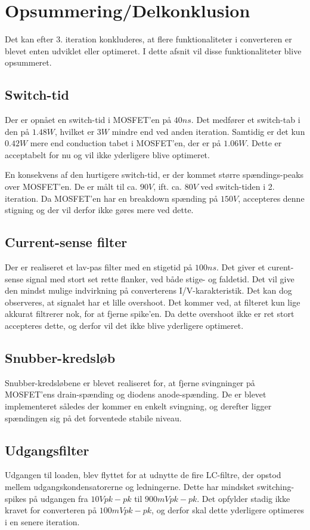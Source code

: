 
\section{Opsummering/Delkonklusion}
Det kan efter 3. iteration konkluderes, at flere funktionaliteter i converteren er blevet enten udviklet eller optimeret. I dette afsnit vil disse funktionaliteter blive opsummeret. 

\subsection{Switch-tid}
Der er opnået en switch-tid i MOSFET'en på $40ns$. Det medfører et switch-tab i den på $1.48W$, hvilket er $3W$ mindre end ved anden iteration. Samtidig er det kun $0.42W$ mere end conduction tabet i MOSFET'en, der er på $1.06W$. Dette er acceptabelt for nu og vil ikke yderligere blive optimeret. 

En konsekvens af den hurtigere switch-tid, er der kommet større spændings-peaks over MOSFET'en. De er målt til ca. $90V$, ift. ca. $80V$ ved switch-tiden i 2. iteration. Da MOSFET'en har en breakdown spænding på $150V$, accepteres denne stigning og der vil derfor ikke gøres mere ved dette.


\subsection{Current-sense filter}
Der er realiseret et lav-pas filter med en stigetid på $100ns$. Det giver et curent-sense signal med stort set rette flanker, ved både stige- og faldetid. Det vil give den mindst mulige indvirkning på converterens I/V-karakteristik. Det kan dog observeres, at signalet har et lille overshoot. Det kommer ved, at filteret kun lige akkurat filtrerer nok, for at fjerne spike'en. Da dette overshoot ikke er ret stort accepteres dette, og derfor vil det ikke blive yderligere optimeret.


\subsection{Snubber-kredsløb}
Snubber-kredsløbene er blevet realiseret for, at fjerne svingninger på MOSFET'ens drain-spænding og diodens anode-spænding. De er blevet implementeret således der kommer en enkelt svingning, og derefter ligger spændingen sig på det forventede stabile niveau. 


\subsection{Udgangsfilter}
Udgangen til loaden, blev flyttet for at udnytte de fire LC-filtre, der opstod mellem udgangskondensatorerne og ledningerne. Dette har mindsket switching-spikes på udgangen fra $10Vpk-pk$ til $900mVpk-pk$. Det opfylder stadig ikke kravet for converteren på $100mVpk-pk$, og derfor skal dette yderligere optimeres i en senere iteration. 

